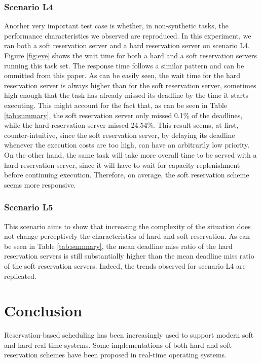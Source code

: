\documentclass[12pt]{article}
\begin{document}
\subsubsection{Scenario L4}
\label{sec:scenario-l4}

Another very important test case is whether, in non-synthetic tasks,
the performance characteristics we observed are reproduced. In this
experiment, we ran both a soft reservation server and a hard
reservation server on scenario L4. Figure \ref{fig:eve} shows the wait
time for both a hard and a soft reservation servers running this task
set. The response time follows a similar pattern and can be ommitted
from this paper. As can be easily seen, the wait time for the hard
reservation server is always higher than for the soft reservation
server, sometimes high enough that the task has already missed its
deadline by the time it starts executing. This might account for the
fact that, as can be seen in Table \ref{tab:summary}, the soft
reservation server only missed 0.1\% of the deadlines, while the hard
reservation server missed 24.54\%. This result seems, at first,
counter-intuitive, since the soft reservation server, by delaying its
deadline whenever the execution costs are too high, can have an
arbitrarily low priority. On the other hand, the same task will take
more overall time to be served with a hard reservation server, since
it will have to wait for capacity replenishment before continuing
execution. Therefore, on average, the soft reservation scheme seems
more responsive.

\subsubsection{Scenario L5}
\label{sec:scenario-l5}

This scenario aims to show that increasing the complexity of the
situation does not change perceptively the characteristics of hard and
soft reservation. As can be seen in Table \ref{tab:summary}, the mean
deadline miss ratio of the hard reservation servers is still
substantially higher than the mean deadline miss ratio of the soft
reservation servers. Indeed, the trends observed for scenario L4 are
replicated.

\section{Conclusion}
\label{sec:conclusion}

Reservation-based scheduling has been increasingly used to support
modern soft and hard real-time systems. Some implementations of both
hard and soft reservation schemes have been proposed in real-time
operating systems.
\end{document}
